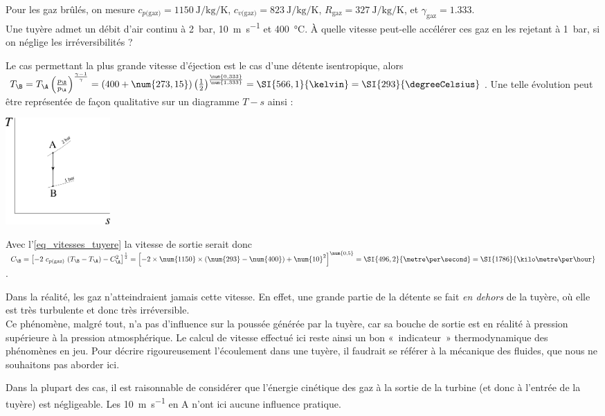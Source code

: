 		\begin{anexample}
		\label{exemple_tuyere}
			Pour les gaz brûlés, on mesure $c_{p\text{(gaz)}} = \SI{1150}{\joule\per\kilogram\per\kelvin}$, $c_{v\text{(gaz)}} = \SI{823}{\joule\per\kilogram\per\kelvin}$, $R_\text{gaz} = \SI{327}{\joule\per\kilogram\per\kelvin}$, et $\gamma_\text{gaz} = \num{1,333}$.\\
			Une tuyère admet un débit d’air continu à \SI{2}{\bar}, \SI{10}{\metre\per\second} et \SI{400}{\degreeCelsius}. À quelle vitesse peut-elle accélérer ces gaz en les rejetant à \SI{1}{\bar}, si on néglige les irréversibilités ?
				\begin{answer}
					Le cas permettant la plus grande vitesse d’éjection est le cas d’une détente isentropique, alors 
					$T_\B = T_\A \left(\frac{p_\B}{p_\A}\right)^{\frac{\gamma - 1}{\gamma}}
					 			= (400 + \num{273,15}) \left(\frac{1}{2}\right)^{\frac{\num{0,333}}{\num{1,333}}}
					 			= \SI{566,1}{\kelvin} = \SI{293}{\degreeCelsius}$.
					Une telle évolution peut être représentée de façon qualitative sur un diagramme $T-s$ ainsi :
						\begin{center}\includegraphics[width=4cm]{images/exe_ts_tuyere.png}\end{center}
					Avec l’\cref{eq_vitesses_tuyere} la vitesse de sortie serait donc 
					$C_\B = \left[ - 2 \ c_{p \text{(gaz)}} \ (T_\B - T_\A) - C_\A^2 \right]^{\frac{1}{2}}
							= \left[ - 2 \times \num{1150} \times (\num{293} - \num{400}) + \num{10}^2 \right]^{\num{0,5}}
							= \SI{496,2}{\metre\per\second} = \SI{1786}{\kilo\metre\per\hour}$.
								\begin{remark}
									Dans la réalité, les gaz n’atteindraient jamais cette vitesse. En effet, une grande partie de la détente se fait \emph{en dehors} de la tuyère, où elle est très turbulente et donc très irréversible.\\
									Ce phénomène, malgré tout, n’a pas d’influence sur la poussée générée par la tuyère, car sa bouche de sortie est en réalité à pression supérieure à la pression atmosphérique. Le calcul de vitesse effectué ici reste ainsi un bon «~indicateur~» thermodynamique des phénomènes en jeu. Pour décrire rigoureusement l’écoulement dans une tuyère, il faudrait se référer à la mécanique des fluides, que nous ne souhaitons pas aborder ici.
								\end{remark}
								\begin{remark}
									Dans la plupart des cas, il est raisonnable de considérer que l’énergie cinétique des gaz à la sortie de la turbine (et donc à l’entrée de la tuyère) est négligeable. Les \SI{10}{\metre\per\second} en A n’ont ici aucune influence pratique.
								\end{remark}
				\end{answer}
		\end{anexample}

